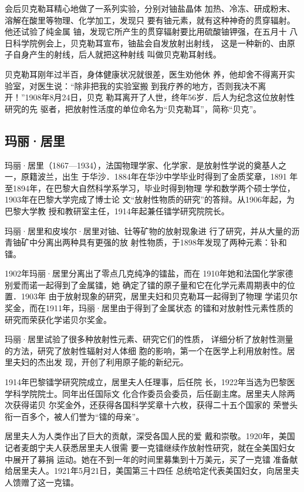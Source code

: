 会后贝克勒耳精心地做了一系列实验，分别对铀盐晶体
加热、冷冻、研成粉末、溶解在酸里等物理、化学加工，发现只
要有铀元素，就有这种神奇的贯穿辐射。他还试验了纯金属
铀，发现它所产生的贯穿辐射要比用硫酸铀钾强，在五月十
八日科学院例会上，贝克勒耳宣布，铀盐会自发放射出射线，
这是一种新的、由原子自身产生的射线，后人就把这种射线
叫做贝克勒耳射线。

贝克勒耳刚年过半百，身体健康状况就很差，医生劝他休
养，他却舍不得离开实验室，对医生说：“除非把我的实验室搬
到我疗养的地方，否则我决不离开！”1908年8月24日，贝克
勒耳离开了人世，终年56岁．后人为纪念这位放射性研究的先
驱者，把放射性活度的单位命名为“贝克勒耳”，简称“贝克”。

\subsection{玛丽·居里}
玛丽·居里（1867—1934），法国物理学家、化学家．是放射性学说的奠基人之一，原籍波兰，出生
于华沙．1884年在华沙中学毕业时得到了金质奖章，1891
年至1894年，在巴黎大自然科学系学习，毕业时得到物理
学和数学两个硕士学位，1903年在巴黎大学完成了博士论
文“放射性物质的研究”的答辩。从1906年起，为巴黎大学教
授和教研室主任，1914年起兼任镭学研究院院长。

玛丽·居里和皮埃尔·居里对铀、钍等矿物的放射现象进
行了研究，并从大量的沥青铀矿中分离出两种具有更强的放
射性物质，于1898年发现了两种元素：钋和镭。

1902年玛丽·居里分离出了零点几克纯净的镭盐，而在
1910年她和法国化学家德别爱而诺一起得到了金属镭，她
确定了镭的原子量和它在化学元素周期表中的位置．1903年
由于放射现象的研究，居里夫妇和贝克勒耳一起得到了物理
学诺贝尔奖金，而在1911年，玛丽·居里由于得到了金属状态
的镭和对放射性元素性质的研究而荣获化学诺贝尔奖金。

玛丽·居里试验了很多种放射性元素、研究它们的性质，
详细分析了放射性测量的方法，研究了放射性辐射对人体细
胞的影响，第一个在医学上利用放射性。居里夫妇的杰出发
现，开创了利用原子能的新纪元。

1914年巴黎镭学研究院成立，居里夫人任理事，后任院
长，1922年当选为巴黎医学科学院院士。同年出任国际文
化合作委员会委员，后任副主席。居里夫人除两次获得诺贝
尔奖金外，还获得各国科学奖章十六枚，获得二十五个国家的
荣誉头衔一百多个，被人们誉为“镭的母亲”。

居里夫人为人类作出了巨大的贡献，深受各国人民的爱
戴和崇敬。1920年，美国记者麦朗宁夫人获悉居里夫人很需
要一克镭继续作放射性研究，就在全美国妇女中展开了募捐
运动。她在不到一年的时间里募集到十万美元，买了一克镭
准备献给居里夫人。1921年5月21日，美国第三十四任
总统哈定代表美国妇女，向居里夫人馈赠了这一克镭。

